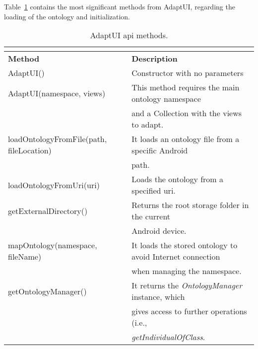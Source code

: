 Table~\ref{tbl:api} contains the most significant methods from AdaptUI, regarding
the loading of the ontology and initialization.

\begin{center}
\footnotesize
\begin{longtable}{l l}
  \caption{AdaptUI \ac{api} methods.}\\
  \label{tbl:api} \\
  \hline 
  \textbf{Method}				& \textbf{Description}\\
  \hline
  AdaptUI()					& Constructor with no parameters			\\
  AdaptUI(namespace, views)			& This method requires the main ontology namespace	\\
						& and a Collection with the views to adapt.		\\
  loadOntologyFromFile(path, fileLocation)	& It loads an ontology file from a specific Android	\\
						& path.							\\
  loadOntologyFromUri(uri)			& Loads the ontology from a specified \ac{uri}.		\\
  getExternalDirectory()			& Returns the root storage folder in the current	\\
						& Android device.					\\
  mapOntology(namespace, fileName)		& It loads the stored ontology to avoid Internet connection\\
						& when managing the namespace.				\\
  getOntologyManager()				& It returns the \textit{OntologyManager} instance, which\\
						& gives access to further operations (i.e., 		\\
						& \textit{getIndividualOfClass}.			\\
  \hline
\end{longtable}
\end{center}


